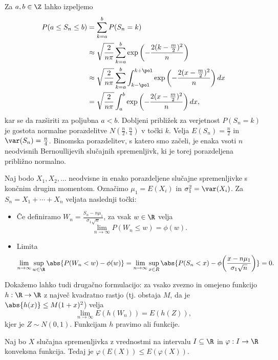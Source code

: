 Za $a, b \in \Z$ lahko izpeljemo
\begin{align*}
  P(a \le S_n \le b)
  &= \sum_{k=a}^b P(S_n = k) \\
  &\approx \sqrt{\frac{2}{n \pi}} \sum_{k=a}^b \exp\left( - \frac{2 (k - \frac{m}{2})^2}{n} \right) \\
  &\approx \sqrt{\frac{2}{n \pi}} \sum_{k=a}^b \int_{k - \pol}^{k + \pol} \exp\left( - \frac{2 (x - \frac{m}{2})^2}{n} \right) dx \\
  &= \sqrt{\frac{2}{n \pi}} \int_{a}^{b} \exp\left( - \frac{2 (x - \frac{m}{2})^2}{n} \right) dx,
\end{align*}
kar se da razširiti za poljubna $a < b$.
Dobljeni približek za verjetnost $P(S_n = k)$ je gostota normalne porazdelitve
$N(\frac{n}{2}, \frac{n}{4})$ v točki $k$.
Velja $E(S_n) = \frac{n}{2}$ in $\var(S_n) = \frac{n}{4}$.
Binomska porazdelitev, s katero smo začeli, je enaka vsoti $n$ neodvisnih
Bernoullijevih slučajnih spremenljivk, ki je torej porazdeljena približno
normalno.

\begin{izrek}
  Naj bodo $X_1, X_2, \ldots$ neodvisne in enako porazdeljene slučajne
  spremenljivke s končnim drugim momentom.
  Označimo $\mu_1 = E(X_i)$ in $\sigma_1^2 = \var(X_i)$.
  Za $S_n = X_1 + \cdots + X_n$ veljata naslednji točki:
  \begin{itemize}
  \item Če definiramo $W_n = \frac{S_n - n \mu_1}{\sigma_1 \sqrt{n}}$, za vsak
	$w \in \R$ velja
	\[
	  \lim_{n \to \infty} P(W_n \le w) = \phi(w).
	\]
  \item Limita
	\[
	  \lim_{n \to \infty} \sup_{w \in \R} \abs{P(W_n < w) - \phi(w)}
	  = \lim_{n \to \infty} \sup_{x \in R} \abs{P(S_n < x) - \phi\!\left(
		  \frac{x - n \mu_1}{\sigma_1 \sqrt{n}} \right)}
	  = 0.
	\]
  \end{itemize}
\end{izrek}


Dokažemo lahko tudi drugačno formulacijo:
za vsako zvezno in omejeno funkcijo $h: \R \to \R$ z največ kvadratno rastjo
(tj. obstaja $M$, da je $\abs{h(x)} \le M(1+x)^2$) velja
\[
  \lim_{n \to \infty} E(h(W_n)) = E(h(Z)),
\]
kjer je $Z \sim N(0,1)$.
Funkcijam $h$ pravimo  ali  funkcije.

\begin{trditev}
  Naj bo $X$ slučajna spremenljivka z vrednostmi na intervalu $I \subseteq \R$
  in $\varphi:I \to \R$ konveksna funkcija.
  Tedaj je $\varphi(E(X)) \le E(\varphi(X))$.
\end{trditev}


